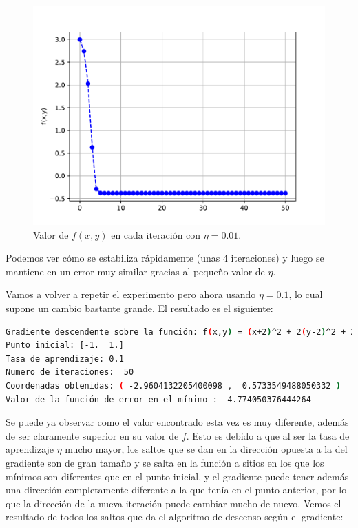\documentclass[12pt]{scrartcl}
\begin{document}
{\begin{figure}[H]
  \centering
  \includegraphics[scale=0.6]{media/f_evolution_e1-2-001.pdf}
  \caption{Valor de $f(x,y)$ en cada iteración con $\eta = 0.01$.}
\end{figure}

Podemos ver cómo se estabiliza rápidamente (unas $4$ iteraciones) y luego se mantiene en un error muy similar gracias al pequeño valor de $\eta$.

Vamos a volver a repetir el experimento pero ahora usando $\eta = 0.1$, lo cual supone un cambio bastante grande. El resultado es el siguiente:

\begin{lstlisting}[language=bash]
Gradiente descendente sobre la función: f(x,y) = (x+2)^2 + 2(y-2)^2 + 2 sin(2pi x) sin(2pi y)
Punto inicial: [-1.  1.]
Tasa de aprendizaje: 0.1
Numero de iteraciones:  50
Coordenadas obtenidas: ( -2.9604132205400098 ,  0.5733549488050332 )
Valor de la función de error en el mínimo :  4.774050376444264
\end{lstlisting}

Se puede ya observar como el valor encontrado esta vez es muy diferente, además de ser claramente superior en su valor de $f$. 
Esto es debido a que al ser la tasa de aprendizaje $\eta$ mucho mayor, los saltos que se dan en la dirección opuesta a la del gradiente son de gran tamaño y se salta en la función a sitios en los que los mínimos son
diferentes que en el punto inicial, y el gradiente puede tener además una dirección completamente diferente a la que tenía en el punto anterior, por lo que la dirección de la nueva iteración puede cambiar mucho de nuevo. Vemos el resultado de todos los saltos que
da el algoritmo de descenso según el gradiente:

}
\end{document}
